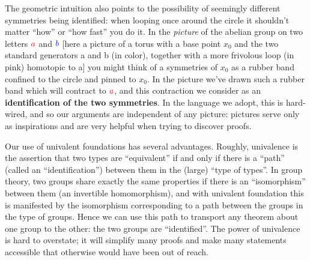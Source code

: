 The geometric intuition also points to the possibility of seemingly different symmetries being identified: when looping once around the circle it shouldn't matter ``how'' or ``how fast'' you do it. In the \emph{picture} of the abelian group on two letters ${\color{red}a}$ and ${\color{blue}b}$
[here a picture of a torus with a base point $x_0$ and the two standard generators a and b (in color), together with a more frivolous loop (in pink) homotopic to a]
you might think of a symmetries of $x_0$ as a {\color{pink}rubber band} confined to the circle and pinned to $x_0$. In the picture we've drawn such a {\color{pink}rubber band} which will contract to ${\color{red}a}$, and this contraction we consider as an \textbf{identification of the two symmetries}.
In the language we adopt, this is hard-wired, and so our arguments are independent of any picture: pictures serve only as inspirations and are very helpful when trying to discover proofs.


Our use of univalent foundations has several advantages. Roughly, univalence is the assertion that two types are ``equivalent'' if and only if there is a ``path'' (called an ``identification'') between them in the (large) ``type of types''. In group theory, two groups share exactly the same properties if there is an ``isomorphism'' between them (an invertible homomorphism), and with univalent foundation this is manifested by the isomorphism corresponding to a path between the groups in the type of groups. Hence we can use this path to transport any theorem about one group to the other: the two groups are ``identified''. The power of univalence is hard to overstate; it will simplify many proofs and make many statements accessible that otherwise would have been out of reach.




